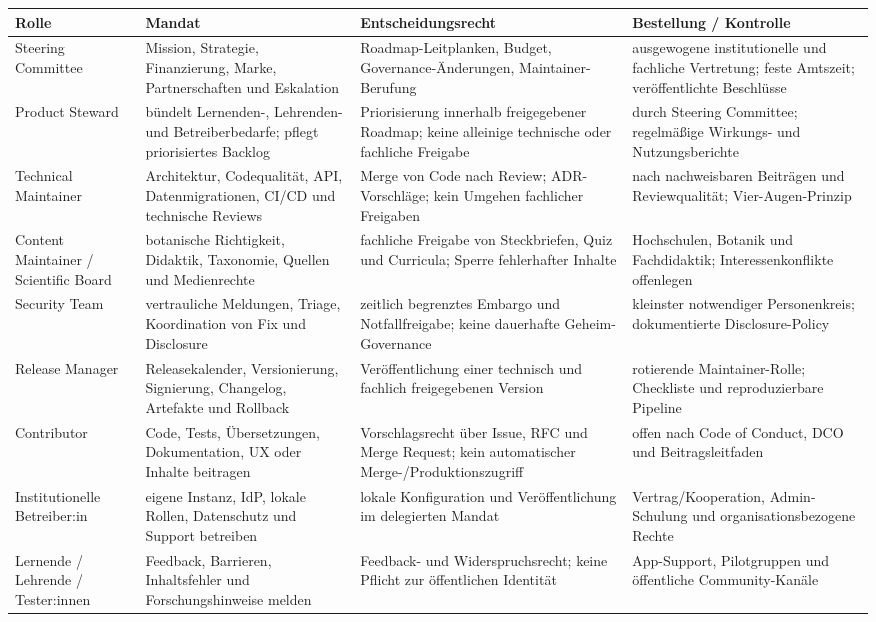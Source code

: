 \documentclass[10pt,a4paper,oneside]{article}
\begin{document}
\begin{longtable}{@{}p{31mm}p{48mm}p{46mm}p{32mm}@{}}
\toprule
\textbf{Rolle} & \textbf{Mandat} & \textbf{Entscheidungsrecht} & \textbf{Bestellung / Kontrolle} \\
\midrule
\endhead
Steering Committee & Mission, Strategie, Finanzierung, Marke, Partnerschaften und Eskalation & Roadmap-Leitplanken, Budget, Governance-Änderungen, Maintainer-Berufung & ausgewogene institutionelle und fachliche Vertretung; feste Amtszeit; veröffentlichte Beschlüsse \\
Product Steward & bündelt Lernenden-, Lehrenden- und Betreiberbedarfe; pflegt priorisiertes Backlog & Priorisierung innerhalb freigegebener Roadmap; keine alleinige technische oder fachliche Freigabe & durch Steering Committee; regelmäßige Wirkungs- und Nutzungsberichte \\
Technical Maintainer & Architektur, Codequalität, API, Datenmigrationen, CI/CD und technische Reviews & Merge von Code nach Review; ADR-Vorschläge; kein Umgehen fachlicher Freigaben & nach nachweisbaren Beiträgen und Reviewqualität; Vier-Augen-Prinzip \\
Content Maintainer / Scientific Board & botanische Richtigkeit, Didaktik, Taxonomie, Quellen und Medienrechte & fachliche Freigabe von Steckbriefen, Quiz und Curricula; Sperre fehlerhafter Inhalte & Hochschulen, Botanik und Fachdidaktik; Interessenkonflikte offenlegen \\
Security Team & vertrauliche Meldungen, Triage, Koordination von Fix und Disclosure & zeitlich begrenztes Embargo und Notfallfreigabe; keine dauerhafte Geheim-Governance & kleinster notwendiger Personenkreis; dokumentierte Disclosure-Policy \\
Release Manager & Releasekalender, Versionierung, Signierung, Changelog, Artefakte und Rollback & Veröffentlichung einer technisch und fachlich freigegebenen Version & rotierende Maintainer-Rolle; Checkliste und reproduzierbare Pipeline \\
Contributor & Code, Tests, Übersetzungen, Dokumentation, UX oder Inhalte beitragen & Vorschlagsrecht über Issue, RFC und Merge Request; kein automatischer Merge-/Produktionszugriff & offen nach Code of Conduct, DCO und Beitragsleitfaden \\
Institutionelle Betreiber:in & eigene Instanz, IdP, lokale Rollen, Datenschutz und Support betreiben & lokale Konfiguration und Veröffentlichung im delegierten Mandat & Vertrag/Kooperation, Admin-Schulung und organisationsbezogene Rechte \\
Lernende / Lehrende / Tester:innen & Feedback, Barrieren, Inhaltsfehler und Forschungshinweise melden & Feedback- und Widerspruchsrecht; keine Pflicht zur öffentlichen Identität & App-Support, Pilotgruppen und öffentliche Community-Kanäle \\
\bottomrule
\end{longtable}
\end{document}
